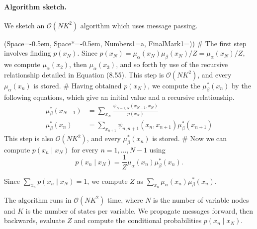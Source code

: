 \documentclass[12pt, a4paper]{article}
\newcommand{\listSpace}{-0.5em}%
\begin{document}
\paragraph{Algorithm sketch.}
We sketch an $\mathcal{O}(NK^2)$ algorithm which uses message passing.
\begin{easylist}[enumerate]
	\ListProperties(Space=\listSpace, Space*=\listSpace, Numbers1=a, FinalMark1={)})
	# The first step involves finding $p(x_{N})$.
	Since $p(x_{N}) = \mu_\alpha(x_N) \mu_\beta(x_N) / Z = \mu_\alpha(x_N)/ Z$, we compute $\mu_\alpha(x_2)$, then $\mu_\alpha(x_3)$, and so forth by use of the recursive relationship detailed in Equation (8.55).
	This step is $\mathcal{O}(NK^2)$, and every $\mu_\alpha(x_n)$ is stored.
	# Having obtained $p(x_{N})$, we compute the $\mu_\beta^*(x_{n})$ by the following equations, which give an initial value and a recursive relationship.
	\begin{align*}
		\mu_\beta^*(x_{N-1}) & = \sum_{x_N} \frac{\psi_{N-1,N}(x_{N-1}, x_N)}{p(x_{N})} \\
		\mu_\beta^*(x_{n}) & = \sum_{x_{n+1}} \psi_{n,n+1}(x_{n}, x_{n+1}) \mu_\beta^*(x_{n+1})
	\end{align*}
	This step is also $\mathcal{O}(NK^2)$, and every $\mu_\beta^*(x_{n})$ is stored.
	# Now we can compute $p(x_n \mid x_{N})$ for every $n = 1, \ldots, N-1$ using
	\begin{equation*}
		p(x_n \mid x_{N}) = \frac{1}{Z} \mu_\alpha(x_n)\mu_\beta^*(x_n).
	\end{equation*}
	
	Since $\sum_{x_n} p(x_n \mid x_{N}) = 1$, we compute $Z$ as $\sum_{x_n} \mu_\alpha(x_n)\mu_\beta^*(x_n)$.
\end{easylist}
The algorithm runs in $\mathcal{O}(NK^2)$ time, where $N$ is the number of variable nodes and $K$ is the number of states per variable.
We propagate messages forward, then backwards, evaluate $Z$ and compute the conditional probabilities $p(x_n \mid x_{N})$.
\end{document}
